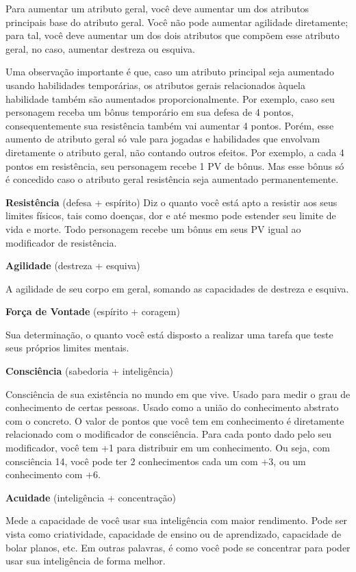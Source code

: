 Para aumentar um atributo geral, você deve aumentar um dos atributos principais base do atributo geral. Você não pode aumentar agilidade diretamente; para tal, você deve aumentar um dos dois atributos que compõem esse atributo geral, no caso, aumentar destreza ou esquiva.

Uma observação importante é que, caso um atributo principal seja aumentado usando habilidades temporárias, os atributos gerais relacionados àquela habilidade também são aumentados proporcionalmente. Por exemplo, caso seu personagem receba um bônus temporário em sua defesa de 4 pontos, consequentemente sua resistência também vai aumentar 4 pontos. Porém, esse aumento de atributo geral só vale para jogadas e habilidades que envolvam diretamente o atributo geral, não contando outros efeitos. Por exemplo, a cada 4 pontos em resistência, seu personagem recebe 1 PV de bônus. Mas esse bônus só é concedido caso o atributo geral resistência seja aumentado permanentemente.

\textbf{Resistência} (defesa + espírito)
Diz o quanto você está apto a resistir aos seus limites físicos, tais como doenças, dor e até mesmo pode estender seu limite de vida e morte. Todo personagem recebe um bônus em seus PV igual ao modificador de resistência.

\textbf{Agilidade} (destreza + esquiva)

A agilidade de seu corpo em geral, somando as capacidades de destreza e esquiva.

\textbf{Força de Vontade} (espírito + coragem)

Sua determinação, o quanto você está disposto a realizar uma tarefa que teste seus próprios limites mentais.

\textbf{Consciência} (sabedoria + inteligência)

Consciência de sua existência no mundo em que vive. Usado para medir o grau de conhecimento de certas pessoas. Usado como a união do conhecimento abstrato com o concreto. O valor de pontos que você tem em conhecimento é diretamente relacionado com o modificador de consciência. Para cada ponto dado pelo seu modificador, você tem +1 para distribuir em um conhecimento. Ou seja, com consciência 14, você pode ter 2 conhecimentos cada um com +3, ou um conhecimento com +6.

\textbf{Acuidade} (inteligência + concentração)

Mede a capacidade de você usar sua inteligência com maior rendimento. Pode ser vista como criatividade, capacidade de ensino ou de aprendizado, capacidade de bolar planos, etc. Em outras palavras, é como você pode se concentrar para poder usar sua inteligência de forma melhor.

